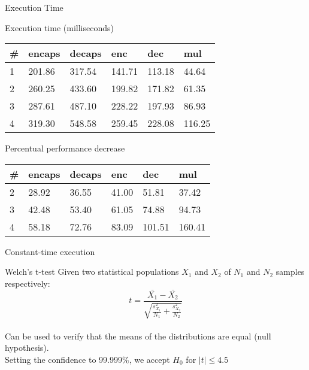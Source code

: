 \begin{frame}{Execution Time}
    \begin{block}{Execution time (milliseconds)}
        \begin{table}
            \begin{tabular}{llllll}
                \# & encaps & decaps & enc & dec & mul \\ \hline
                1 & 201.86 & 317.54 & 141.71 & 113.18 & 44.64 \\
                2 & 260.25 & 433.60 & 199.82 & 171.82 & 61.35 \\
                3 & 287.61 & 487.10 & 228.22 & 197.93 & 86.93 \\
                4 & 319.30 & 548.58 & 259.45 & 228.08 & 116.25             
            \end{tabular}
        \end{table}
    \end{block}
    \begin{block}{Percentual performance decrease}
        \begin{table}
            \begin{tabular}{llllll}
                \# & encaps & decaps & enc & dec & mul \\ \hline
                2 & 28.92 & 36.55 & 41.00 & 51.81 & 37.42 \\
                3 & 42.48 & 53.40 & 61.05 & 74.88 & 94.73 \\
                4 & 58.18 & 72.76 & 83.09 & 101.51 & 160.41
            \end{tabular}
        \end{table}
    \end{block}
\end{frame}

\begin{frame}{Constant-time execution}
    \begin{block}{Welch's t-test}
        Given two statistical populations $X_1$ and $X_2$ of $N_1$ and $N_2$ samples respectively:
        \begin{equation*}
            t = \frac{\bar{X_1} - \bar{X_2}}{\sqrt{\frac{s_{X_1}^2}{N_1} + \frac{s_{X_2}^2}{N_2}}}
        \end{equation*}\\
    Can be used to verify that the means of the distributions are equal (null hypothesis).\\
    Setting the confidence to 99.999\%, we accept $H_0$ for $|t| \leq 4.5$
    \end{block}
\end{frame}

